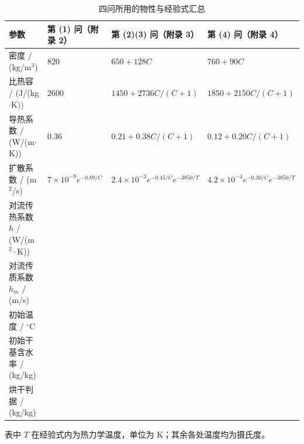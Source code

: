 \begin{table}[H]
  \centering
  \caption{四问所用的物性与经验式汇总}\label{tab:params}
  \footnotesize
  \begin{tabularx}{\textwidth}{@{}l >{\raggedright\arraybackslash}X >{\raggedright\arraybackslash}X >{\raggedright\arraybackslash}X@{}}
    \toprule
    参数 & 第 (1) 问（附录 2） & 第 (2)(3) 问（附录 3） & 第 (4) 问（附录 4） \\
    \midrule
    密度 / (kg/m$^3$) & $820$ & $650+128C$ & $760+90C$ \\
    比热容 / (J/(kg$\cdot$K)) & $2600$ & $1450+2736C/(C+1)$ & $1850+2150C/(C+1)$ \\
    导热系数 / (W/(m$\cdot$K)) & $0.36$ & $0.21+0.38C/(C+1)$ & $0.12+0.20C/(C+1)$ \\
    扩散系数 / (m$^2$/s) & $7\times10^{-9}e^{-0.89/C}$ & $2.4\times10^{-3}e^{-0.45/C}e^{-3850/T}$ & $4.2\times10^{-4}e^{-0.30/C}e^{-3850/T}$ \\
    \midrule
    对流传热系数 $h$ / (W/(m$^2\cdot$K)) & \multicolumn{3}{c}{$25$} \\
    对流传质系数 $h_m$ / (m/s) & \multicolumn{3}{c}{$8\times10^{-7}$} \\
    初始温度 / $^\circ$C & \multicolumn{3}{c}{$28$} \\
    初始干基含水率 / (kg/kg) & \multicolumn{3}{c}{$2.55$} \\
    烘干判据 / (kg/kg) & \multicolumn{3}{c}{全域最大 $\le 0.15$} \\
    \bottomrule
  \end{tabularx}
  \par\smallskip\footnotesize 表中 $T$ 在经验式内为热力学温度，单位为 K；其余各处温度均为摄氏度。
\end{table}
